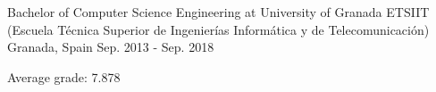 

\begin{cventries}

  \cventry
    {Bachelor of Computer Science Engineering at University of Granada} %
    {ETSIIT (Escuela Técnica Superior de Ingenierías Informática y de Telecomunicación)} %
    {Granada, Spain} %
    {Sep. 2013 - Sep. 2018} %
    {
      \begin{cvitems} %
        \item {Average grade: 7.878}
      \end{cvitems}
    }

\end{cventries}
